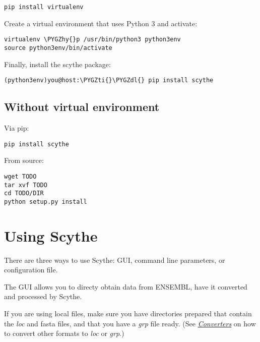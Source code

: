 \documentclass[letterpaper,10pt,english]{sphinxmanual}
\def\PYGZdl{\char`\$}
\def\PYGZhy{\char`\-}
\def\PYGZti{\char`\~}
\begin{document}
\begin{Verbatim}[commandchars=\\\{\}]
pip install virtualenv
\end{Verbatim}

Create a virtual environment that uses Python 3 and activate:

\begin{Verbatim}[commandchars=\\\{\}]
virtualenv \PYGZhy{}p /usr/bin/python3 python3env
source python3env/bin/activate
\end{Verbatim}

Finally, install the scythe package:

\begin{Verbatim}[commandchars=\\\{\}]
(python3env)you@host:\PYGZti{}\PYGZdl{} pip install scythe
\end{Verbatim}


\subsection{Without virtual environment}
\label{Tutorial:without-virtual-environment}
Via pip:

\begin{Verbatim}[commandchars=\\\{\}]
pip install scythe
\end{Verbatim}

From source:

\begin{Verbatim}[commandchars=\\\{\}]
wget TODO
tar xvf TODO
cd TODO/DIR
python setup.py install
\end{Verbatim}


\section{Using Scythe}
\label{Tutorial:usingscythe}\label{Tutorial:using-scythe}
There are three ways to use Scythe: GUI, command line parameters, or configuration file.

The GUI allows you to directy obtain data from ENSEMBL, have it converted and processed by Scythe.

If you are using local files, make sure you have directories prepared that contain the \emph{loc} and fasta files, and that you have a \emph{grp} file ready.
(See {\hyperref[Converters:converters]{\emph{Converters}}} on how to convert other formats to \emph{loc} or \emph{grp}.)
\end{document}
